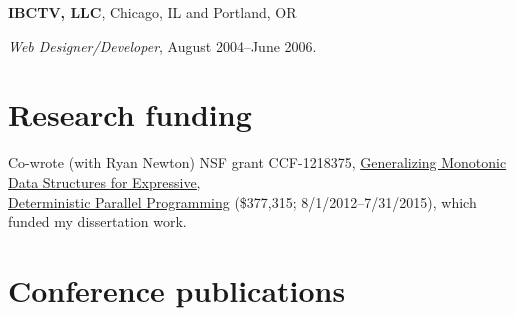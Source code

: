 \documentclass[10pt,letterpaper]{article}
\newenvironment{itemize*}
  {\begin{itemize}
      \setlength{\itemsep}{1pt}
      \setlength{\parskip}{3pt}
  }
  {\end{itemize}}
\begin{document}
\begin{itemize*}
\item \textbf{IBCTV, LLC}, Chicago, IL and Portland, OR
  \begin{itemize*}
  \item \textit{Web Designer/Developer}, August 2004--June 2006.
  \end{itemize*}

\end{itemize*}

\section*{Research funding}

\begin{itemize*}
\item Co-wrote (with Ryan Newton) NSF grant CCF-1218375,
  \href{http://nsf.gov/awardsearch/showAward?AWD_ID=1218375}{Generalizing
    Monotonic Data Structures for Expressive, \\
    Deterministic Parallel Programming} (\$377,315; 8/1/2012--7/31/2015),
  which funded my dissertation work.
\end{itemize*}

\section*{Conference publications}
\end{document}

